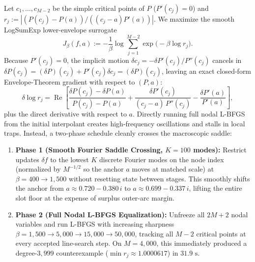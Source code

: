 \documentclass[11pt,a4paper]{amsart}
\theoremstyle{remark}
\DeclareMathOperator{\RePart}{Re}
\begin{document}
Let $c_1, \dots, c_{M-2}$ be the simple critical points of $P$ ($P'(c_j) = 0$)
and $r_j := |(P(c_j) - P(a)) / ((c_j - a) P'(a))|$. We maximize the smooth
LogSumExp lower-envelope surrogate
\[
  J_\beta(f, a) := -\frac{1}{\beta}\log \sum_{j=1}^{M-2} \exp\!\bigl(-\beta \log r_j\bigr).
\]
Because $P'(c_j) = 0$, the implicit motion $\delta c_j = -\delta P'(c_j)/P''(c_j)$
cancels in $\delta P(c_j) = (\delta P)(c_j) + P'(c_j)\delta c_j = (\delta P)(c_j)$,
leaving an exact closed-form Envelope-Theorem gradient with respect to $(P, a)$:
\begin{equation}\label{eq:envelope}
  \delta \log r_j
  = \RePart\!\left[
      \frac{\delta P(c_j) - \delta P(a)}{P(c_j) - P(a)}
      + \frac{\delta P'(c_j)}{(c_j - a)\, P''(c_j)}
      - \frac{\delta P'(a)}{P'(a)}
    \right],
\end{equation}
plus the direct derivative with respect to $a$. Directly running full nodal
L-BFGS from the initial interpolant creates high-frequency oscillations and
stalls in local traps. Instead, a two-phase schedule cleanly crosses the
macroscopic saddle:
\begin{enumerate}
  \item \textbf{Phase 1 (Smooth Fourier Saddle Crossing, $K = 100$ modes):}
  Restrict updates $\delta f$ to the lowest $K$ discrete Fourier modes on the
  node index (normalized by $M^{-1/2}$ so the anchor $a$ moves at matched scale)
  at $\beta = 400 \to 1{,}500$ without resetting state between stages. This
  smoothly shifts the anchor from $a \approx 0.720 - 0.380\,i$ to
  $a \approx 0.699 - 0.337\,i$, lifting the entire slot floor at the expense of
  surplus outer-arc margin.
  \item \textbf{Phase 2 (Full Nodal L-BFGS Equalization):}
  Unfreeze all $2M + 2$ nodal variables and run L-BFGS with increasing sharpness
  $\beta = 1{,}500 \to 5{,}000 \to 15{,}000 \to 50{,}000$, tracking all $M - 2$
  critical points at every accepted line-search step. On $M = 4{,}000$, this
  immediately produced a degree-$3{,}999$ counterexample
  ($\min r_j \approx 1.0000617$) in $31.9\text{ s}$.
\end{enumerate}
\end{document}
